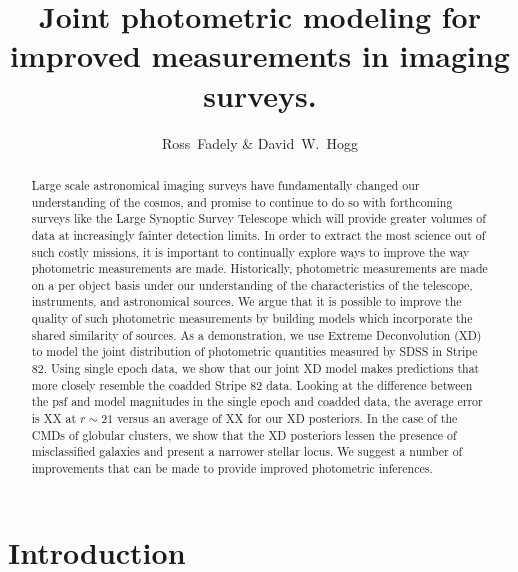 \documentclass[12pt,preprint]{aastex}
\begin{document}
\title{Joint photometric modeling for improved measurements in imaging surveys.}
\author{Ross~Fadely \&
        David~W.~Hogg}


%
%
\begin{abstract}
Large scale astronomical imaging surveys have fundamentally changed our 
understanding of the cosmos, and promise to continue to do so with 
forthcoming surveys like the Large Synoptic Survey Telescope which will 
provide greater volumes of data at increasingly fainter detection limits.  
In order to extract the most science out of such costly missions, it is 
important to continually explore ways to improve the way photometric 
measurements are made.  Historically, photometric measurements are made 
on a per object basis under our understanding of the characteristics of 
the telescope, instruments, and astronomical sources.  We argue that it 
is possible to improve the quality of such photometric measurements by 
building models which incorporate the shared similarity of sources.  As 
a demonstration, we use Extreme Deconvolution (XD) to model the joint 
distribution of photometric quantities measured by SDSS in Stripe 82.  
Using single epoch data, we show that our joint XD model makes predictions 
that more closely resemble the coadded Stripe 82 data.  Looking at the 
difference between the psf and model magnitudes in the single epoch and 
coadded data, the average error is XX at $r\sim21$ versus an average of 
XX for our XD posteriors.  In the case of the CMDs of globular clusters, 
we show that the XD posteriors lessen the presence of misclassified 
galaxies and present a narrower stellar locus.  We suggest a number of 
improvements that can be made to provide improved photometric inferences.
\end{abstract}

%
%
\section{Introduction}


%
%
\end{document}
